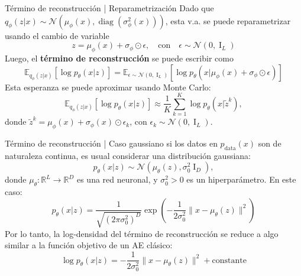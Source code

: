 \documentclass{beamer}
\newcommand{\R}{\mathbb{R}}
\begin{document}
\begin{frame}{Término de reconstrucción | Reparametrización}
    Dado que $q_\phi(z|x)\sim\mathcal{N}\left(\mu_\phi(x),\operatorname{diag}(\sigma_\phi^2(x))\right)$, esta v.a. se puede reparametrizar usando el cambio de variable
    \begin{equation*}
        z=\mu_\phi(x)+\sigma_\phi\odot \epsilon,
        \quad\text{con}\quad
        \epsilon\sim\mathcal{N}(0,\operatorname{I}_L)
    \end{equation*}
    Luego, el \textbf{término de reconstrucción} se puede escribir como
    \begin{equation*}
        \mathbb{E}_{q_\phi(z|x)}\left[\log p_\theta(x|z)\right] =
        \mathbb{E}_{\epsilon\sim\mathcal{N}(0,\operatorname{I}_L)}\left[\log p_\theta(x|\mu_\phi(x)+\sigma_\phi\odot \epsilon)\right]
    \end{equation*}
    Esta esperanza se puede aproximar usando Monte Carlo:
    \begin{equation*}
        \mathbb{E}_{q_\phi(z|x)}\left[\log p_\theta(x|z)\right] \approx \frac{1}{K} \sum_{k=1}^K \log p_\theta(x|\tilde z^k),
    \end{equation*}
    donde $\tilde z^k=\mu_\phi(x)+\sigma_\phi(x)\odot \epsilon_k$, con  $\epsilon_k\sim\mathcal{N}(0,\operatorname{I}_L)$.
\end{frame}

\begin{frame}{Término de reconstrucción | Caso gaussiano}
    si los datos en $p_\text{data}(x)$ son de naturaleza continua, es usual considerar una distribución gaussiana:
    \begin{equation*}
        p_\theta(x|z) \sim \mathcal{N}(\mu_\theta(z), \sigma^2_0\operatorname{I}_D),
    \end{equation*}
    donde $\mu_\theta:\R^L\to\R^D$ es una red neuronal, y $\sigma_0^2>0$ es un hiperparámetro. En este caso:
    \begin{equation*}
        p_\theta(x|z)=\frac{1}{\sqrt{(2\pi\sigma_0^2)^D}}\exp\left(-\frac{1}{2\sigma_0^2}\|x-\mu_\theta(z)\|^2\right)
    \end{equation*}
    Por lo tanto, la log-densidad del término de reconstrucción se reduce a algo similar a la función objetivo de un AE clásico:
    \begin{equation*}
        \log p_\theta(x|z)=-\frac{1}{2\sigma_0^2}\|x-\mu_\theta(z)\|^2 + \text{constante}
    \end{equation*}
\end{frame}
\end{document}
